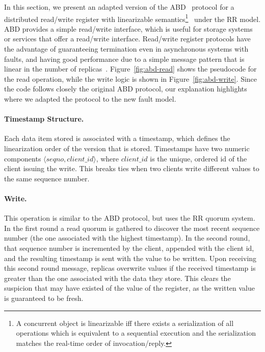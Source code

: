 In this section, we present an adapted version of the
ABD~\cite{abd} protocol for a distributed read/write register
with linearizable semantics\footnote{A concurrent object is
linearizable iff there exists a serialization of all operations
which is equivalent to a sequential execution and the
serialization matches the real-time order of
invocation/reply.}~\cite{linearizability} under the \ac{RR}
model. ABD provides a simple read/write interface, which is
useful for storage systems or services that offer a read/write
interface. Read/write register protocols have the advantage of
guaranteeing termination even in asynchronous systems with
faults, and having good performance due to a simple message
pattern that is linear in the number of
replicas~\cite{gryff:nsdi20}.
%
Figure~\ref{fig:abd-read} shows the pseudocode for the read
operation, while the write logic is shown in
Figure~\ref{fig:abd-write}. Since the code follows closely the
original ABD protocol, our explanation highlights where we
adapted the protocol to the new fault model.

\paragraph{Timestamp Structure.}
Each data item stored is associated with a
timestamp, which defines the linearization order of the version
that is stored. Timestamps have two numeric components $\langle
seqno, client\_id \rangle$, where $client\_id$ is the
unique, ordered id of the client issuing the write.  This
breaks ties when two clients write different values to the same
sequence number.

\paragraph{Write.}  This operation is similar to the ABD
protocol, but uses the \ac{RR} quorum system. In the first round
a read quorum is gathered to discover the most recent sequence number
(the one associated with the highest timestamp).  In the second round,
that sequence number is incremented by the client, appended with the
client id, and the resulting timestamp is sent with the value to be
written. Upon receiving this second round message, replicas overwrite
values if the received timestamp is greater than the one associated
with the data they store. This clears the suspicion that may have
existed of the value of the register, as the written value is
guaranteed to be fresh.


